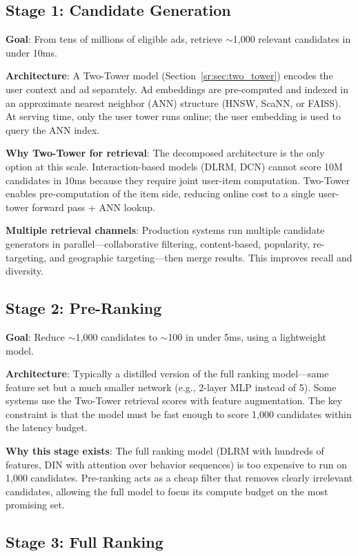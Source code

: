 \subsection{Stage 1: Candidate Generation}

\textbf{Goal}: From tens of millions of eligible ads, retrieve $\sim$1,000 relevant candidates in under 10ms.

\textbf{Architecture}: A Two-Tower model (Section~\ref{sr:sec:two_tower}) encodes the user context and ad separately. Ad embeddings are pre-computed and indexed in an approximate nearest neighbor (ANN) structure (HNSW, ScaNN, or FAISS). At serving time, only the user tower runs online; the user embedding is used to query the ANN index.

\textbf{Why Two-Tower for retrieval}: The decomposed architecture is the only option at this scale. Interaction-based models (DLRM, DCN) cannot score 10M candidates in 10ms because they require joint user-item computation. Two-Tower enables pre-computation of the item side, reducing online cost to a single user-tower forward pass + ANN lookup.

\textbf{Multiple retrieval channels}: Production systems run multiple candidate generators in parallel---collaborative filtering, content-based, popularity, re-targeting, and geographic targeting---then merge results. This improves recall and diversity.

\subsection{Stage 2: Pre-Ranking}

\textbf{Goal}: Reduce $\sim$1,000 candidates to $\sim$100 in under 5ms, using a lightweight model.

\textbf{Architecture}: Typically a distilled version of the full ranking model---same feature set but a much smaller network (e.g., 2-layer MLP instead of 5). Some systems use the Two-Tower retrieval scores with feature augmentation. The key constraint is that the model must be fast enough to score 1,000 candidates within the latency budget.

\textbf{Why this stage exists}: The full ranking model (DLRM with hundreds of features, DIN with attention over behavior sequences) is too expensive to run on 1,000 candidates. Pre-ranking acts as a cheap filter that removes clearly irrelevant candidates, allowing the full model to focus its compute budget on the most promising set.

\subsection{Stage 3: Full Ranking}

